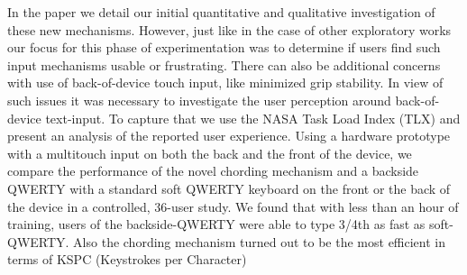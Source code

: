 In the paper we detail our initial quantitative and qualitative investigation of these new mechanisms. However, just like in the case of other exploratory works \cite{RearType} our focus for this phase of experimentation was to determine if users find such input mechanisms usable or frustrating. There can also be additional concerns with use of back-of-device touch input, like minimized grip stability. In view of such issues it was necessary to investigate the user perception around back-of-device text-input. To capture that we use the NASA Task Load Index (TLX) and present an analysis of the reported user experience. Using a hardware prototype with a multitouch input on both the back and the front of the device, we compare the performance of the novel chording mechanism and a backside QWERTY with a standard soft QWERTY keyboard on the front or the back of the device in a controlled, 36-user study. We found that with less than an hour of training, users of the backside-QWERTY were able to type 3/4th as fast as soft-QWERTY. Also the chording mechanism turned out to be the most efficient in terms of KSPC (Keystrokes per Character)
